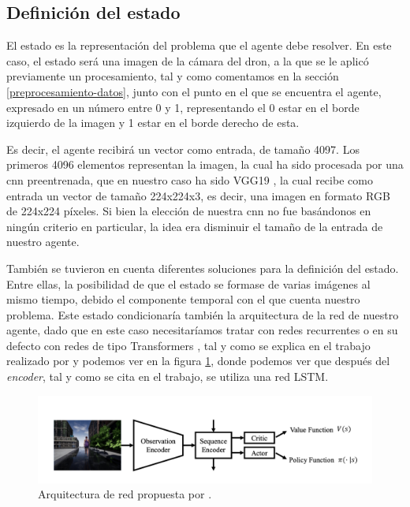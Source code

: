 

\subsection{Definición del estado}
\label{definicion-del-estado}

El estado es la representación del problema que el agente debe resolver. En este caso, el estado será una imagen de la cámara del dron, a la que se le aplicó previamente un procesamiento, tal y como comentamos en la sección \ref{preprocesamiento-datos}, junto con el punto en el que se encuentra el agente, expresado en un número entre 0 y 1, representando el 0 estar en el borde izquierdo de la imagen y 1 estar en el borde derecho de esta.
\medskip

Es decir, el agente recibirá un vector como entrada, de tamaño 4097. Los primeros 4096 elementos representan la imagen, la cual ha sido procesada por una \acrshort{cnn} preentrenada, que en nuestro caso ha sido VGG19 \citep{vgg19}, la cual recibe como entrada un vector de tamaño 224x224x3, es decir, una imagen en formato RGB de 224x224 píxeles. Si bien la elección de nuestra \acrshort{cnn} no fue basándonos en ningún criterio en particular, la idea era disminuir el tamaño de la entrada de nuestro agente. 
\medskip

También se tuvieron en cuenta diferentes soluciones para la definición del estado. Entre ellas, la posibilidad de que el estado se formase de varias imágenes al mismo tiempo, debido el componente temporal con el que cuenta nuestro problema. Este estado condicionaría también la arquitectura de la red de nuestro agente, dado que en este caso necesitaríamos tratar con redes recurrentes o en su defecto con redes de tipo Transformers \citep{transformers}, tal y como se explica en el trabajo realizado por \citet{luo2019end} y podemos ver en la figura \ref{fig-arquitectura-red-luo}, donde podemos ver que después del \textit{encoder}, tal y como se cita en el trabajo, se utiliza una red \acrshort{LSTM}.
\medskip

\begin{figure}[H]
    \centering
    \includegraphics[scale=0.3]{figuras/luo_network_architecture.png}
    \caption[Arquitectura de red propuesta por \citet{luo2019end}.]{Arquitectura de red propuesta por \citet{luo2019end}.}
    \label{fig-arquitectura-red-luo}
\end{figure}

